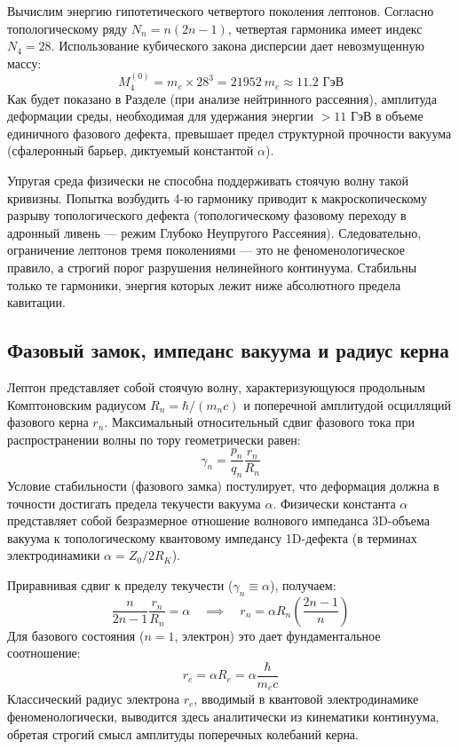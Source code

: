 \documentclass[12pt,a4paper]{article}
\begin{document}
	Вычислим энергию гипотетического четвертого поколения лептонов. Согласно топологическому ряду $N_n = n(2n-1)$, четвертая гармоника имеет индекс $N_4 = 28$. Использование кубического закона дисперсии дает невозмущенную массу:
	\begin{equation}
		M_4^{(0)} = m_e \times 28^3 = 21952 \ m_e \approx 11.2 \text{ ГэВ}
	\end{equation}
	Как будет показано в Разделе (при анализе нейтринного рассеяния), амплитуда деформации среды, необходимая для удержания энергии $> 11$ ГэВ в объеме единичного фазового дефекта, превышает предел структурной прочности вакуума (сфалеронный барьер, диктуемый константой $\alpha$). 
	
	Упругая среда физически не способна поддерживать стоячую волну такой кривизны. Попытка возбудить 4-ю гармонику приводит к макроскопическому разрыву топологического дефекта (топологическому фазовому переходу в адронный ливень — режим Глубоко Неупругого Рассеяния). Следовательно, ограничение лептонов тремя поколениями — это не феноменологическое правило, а строгий порог разрушения нелинейного континуума. Стабильны только те гармоники, энергия которых лежит ниже абсолютного предела кавитации.
	
	\subsection{Фазовый замок, импеданс вакуума и радиус керна}
	Лептон представляет собой стоячую волну, характеризующуюся продольным Комптоновским радиусом $R_n = \hbar / (m_n c)$ и поперечной амплитудой осцилляций фазового керна $r_n$. Максимальный относительный сдвиг фазового тока при распространении волны по тору геометрически равен:
	\begin{equation}
		\gamma_n = \frac{p_n}{q_n} \frac{r_n}{R_n}
	\end{equation}
	Условие стабильности (фазового замка) постулирует, что деформация должна в точности достигать предела текучести вакуума $\alpha$. Физически константа $\alpha$ представляет собой безразмерное отношение волнового импеданса 3D-объема вакуума к топологическому квантовому импедансу 1D-дефекта (в терминах электродинамики $\alpha = Z_0 / 2R_K$). 
	
	Приравнивая сдвиг к пределу текучести ($\gamma_n \equiv \alpha$), получаем:
	\begin{equation}
		\frac{n}{2n-1} \frac{r_n}{R_n} = \alpha \quad \implies \quad r_n = \alpha R_n \left( \frac{2n-1}{n} \right)
	\end{equation}
	Для базового состояния ($n=1$, электрон) это дает фундаментальное соотношение:
	\begin{equation}
		r_e = \alpha R_e = \alpha \frac{\hbar}{m_e c}
	\end{equation}
	Классический радиус электрона $r_e$, вводимый в квантовой электродинамике феноменологически, выводится здесь аналитически из кинематики континуума, обретая строгий смысл амплитуды поперечных колебаний керна.
	
\end{document}
